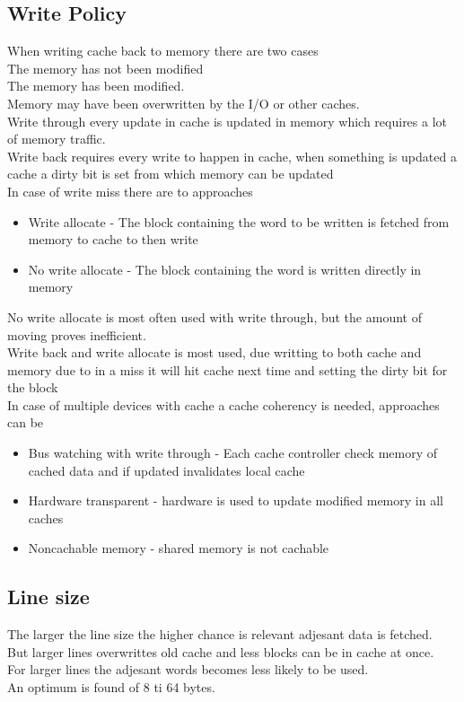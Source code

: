 \documentclass[12pt, a4paper]{article}
\begin{document}
		\subsection{Write Policy}
			When writing cache back to memory there are two cases\\
			The memory has not been modified\\
			The memory has been modified.\\
			Memory may have been overwritten by the I/O or other caches.\\
			Write through every update in cache is updated in memory which requires a lot of memory traffic.\\
			Write back requires every write to happen in cache, when something is updated a cache a dirty bit is set from which memory can be updated\\
			In case of write miss there are to approaches
			\begin{itemize}
				\item Write allocate - The block containing the word to be written is fetched from memory to cache to then write
				\item No write allocate - The block containing the word is written directly in memory
			\end{itemize}
			No write allocate is most often used with write through, but the amount of moving proves inefficient.\\
			Write back and write allocate is most used, due writting to both cache and memory due to in a miss it will hit cache next time and setting the dirty bit for the block\\
			In case of multiple devices with cache a cache coherency is needed, approaches can be
			\begin{itemize}
				\item Bus watching with write through - Each cache controller check memory of cached data and if updated invalidates local cache
				\item Hardware transparent - hardware is used to update modified memory in all caches
				\item Noncachable memory - shared memory is not cachable
			\end{itemize}
		\subsection{Line size}
			The larger the line size the higher chance is relevant adjesant data is fetched.\\
			But larger lines overwrittes old cache and less blocks can be in cache at once.\\
			For larger lines the adjesant words becomes less likely to be used.\\
			An optimum is found of 8 ti 64 bytes.
\end{document}
